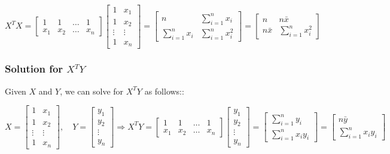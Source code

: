 \documentclass[
  letterpaper,
  DIV=11,
  numbers=noendperiod]{scrartcl}
\begin{document}
\[X^TX = \begin{bmatrix} 1 & 1 & \dots & 1 \\ x_1 & x_2 & \dots & x_n \end{bmatrix} \begin{bmatrix} 1 & x_1 \\ 1 & x_2 \\ \vdots & \vdots \\ 1 & x_n \end{bmatrix} = \begin{bmatrix} n & \sum_{i=1}^{n}x_i \\ \sum_{i=1}^{n}x_i & \sum_{i=1}^{n}x_i^2 \end{bmatrix} = \begin{bmatrix} n & n\bar{x} \\ n\bar{x} & \sum_{i=1}^{n}x_i^2 \end{bmatrix}\]

\hypertarget{solution-for-xty}{%
\subsubsection{\texorpdfstring{Solution for
\(X^TY\)}{Solution for X\^{}TY}}\label{solution-for-xty}}

Given \(X\) and \(Y\), we can solve for \(X^TY\) as follows::

\[ X = \begin{bmatrix} 1 & x_1 \\ 1 & x_2 \\ \vdots & \vdots \\ 1 & x_n \end{bmatrix}, \quad Y = \begin{bmatrix} y_1 \\ y_2 \\ \vdots \\ y_n \end{bmatrix} \Rightarrow  X^TY = \begin{bmatrix} 1 & 1 & \dots & 1 \\ x_1 & x_2 & \dots & x_n \end{bmatrix} \begin{bmatrix} y_1 \\ y_2 \\ \vdots \\ y_n \end{bmatrix} = \begin{bmatrix} \sum_{i=1}^{n}y_i \\ \sum_{i=1}^{n}x_iy_i \end{bmatrix} = \begin{bmatrix} n\bar{y} \\ \sum_{i=1}^{n}x_iy_i \end{bmatrix}\]
\end{document}
